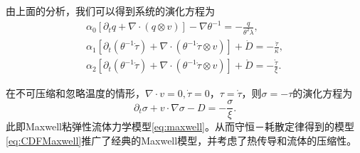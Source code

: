 	由上面的分析，我们可以得到系统的演化方程为\cite{zhu2014conservation}
	\begin{subequations}\label{eq:CDFMaxwell}
		\begin{align}
			\alpha_0 [\partial_t q +  \nabla \cdot (q \otimes v)] - \nabla \theta^{-1} = -\frac{q}{\theta^2 \lambda}, \\
			\alpha_1[\partial_t (\theta^{-1} \dot{\tau}) + \nabla \cdot (\theta^{-1} \dot{\tau} \otimes v)] + \dot{D} = -\frac{\dot{\tau}}{\kappa}, \\
			\alpha_2[\partial_t (\theta^{-1} \mathring{\tau}) + \nabla \cdot (\theta^{-1} \mathring{\tau} \otimes v)] + \mathring{D} = -\frac{\mathring{\tau}}{\xi}. 
		\end{align}
	\end{subequations}


	在不可压缩和忽略温度的情形，$\nabla \cdot v = 0, \dot{\tau}=0$，$\tau = \mathring{\tau}$，则$\sigma = -\tau$的演化方程为
	\begin{equation*}
		\partial_t \sigma + v \cdot \nabla \sigma - D = -\frac{\sigma}{\xi}. 
	\end{equation*}
	此即Maxwell粘弹性流体力学模型\eqref{eq:maxwell}。从而守恒－耗散定律得到的模型\eqref{eq:CDFMaxwell}推广了经典的Maxwell模型，并考虑了热传导和流体的压缩性。	

